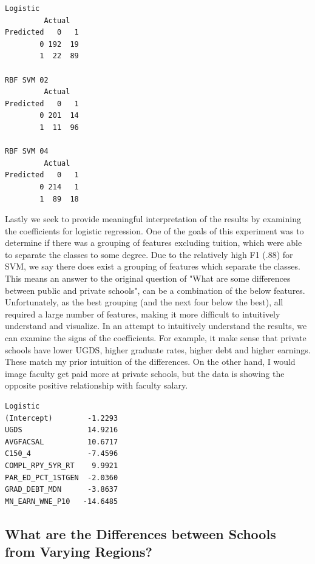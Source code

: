 \documentclass[10pt]{article}
\begin{document}
\begin{lstlisting}
Logistic
         Actual
Predicted   0   1
        0 192  19
        1  22  89 

RBF SVM 02
         Actual
Predicted   0   1
        0 201  14
        1  11  96
        
RBF SVM 04
         Actual
Predicted   0   1
        0 214   1
        1  89  18
\end{lstlisting}

Lastly we seek to provide meaningful interpretation of the results by examining the coefficients for logistic regression. One of the goals of this experiment was to determine if there was a grouping of features excluding tuition, which were able to separate the classes to some degree. Due to the relatively high F1 (.88) for SVM, we say there does exist a grouping of features which separate the classes. This means an answer to the original question of "What are some differences between public and private schools", can be a combination of the below features. Unfortunately, as the best grouping (and the next four below the best), all required a large number of features, making it more difficult to intuitively understand and visualize. In an attempt to intuitively understand the results, we can examine the signs of the coefficients. For example, it make sense that private schools have lower UGDS, higher graduate rates, higher debt and higher earnings. These match my prior intuition of the differences. On the other hand, I would image faculty get paid more at private schools, but the data is showing the opposite positive relationship with faculty salary.

\begin{lstlisting}
Logistic
(Intercept)        -1.2293
UGDS               14.9216
AVGFACSAL          10.6717
C150_4             -7.4596
COMPL_RPY_5YR_RT    9.9921
PAR_ED_PCT_1STGEN  -2.0360 
GRAD_DEBT_MDN      -3.8637  
MN_EARN_WNE_P10   -14.6485
\end{lstlisting}

\subsection{What are the Differences between Schools from Varying Regions?}
\end{document}
